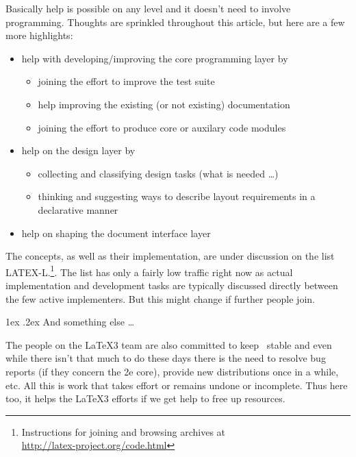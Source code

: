 \documentclass{ltnews}
\makeatletter
\newcommand{\@subheadingfont}{%
   \sffamily\slshape
   \let\LaTeX\cmssLaTeX\let\TeX\cmssTeX
}
\renewcommand{\subsection}{%
   \@startsection
      {subsection}{2}{\z@}{-1.5ex \@plus -1ex \@minus -.2ex}%
      {1ex \@plus.2ex}{\@subheadingfont}%
}
\makeatother
\begin{document}
Basically help is possible on any level and it doesn't need to involve programming. Thoughts are sprinkled throughout this article, but here are a few more highlights:
\begin{itemize}
\item help with developing/improving the core programming layer by
\begin{itemize}[nosep]
\item joining the effort to improve the test suite
\item help improving the existing (or not existing) documentation
\item joining the effort to produce core or auxilary code modules
\end{itemize}
\item help on the design layer by
\begin{itemize}[nosep]
\item collecting and classifying design tasks (what is needed \dots)
\item thinking and suggesting ways to describe layout requirements in a declarative manner
\end{itemize}
\item help on shaping the document interface layer
\end{itemize}
The concepts, as well as their implementation, are under discussion on the list LATEX-L.\footnote{Instructions for joining and browsing archives at\\ \url{http://latex-project.org/code.html}}.
The list has only a fairly low traffic right now as actual implementation and development tasks are typically discussed directly between the few active implementers. But this might change if further people join.

\subsection{And something else \dots}

The people on the \LaTeX3 team are also committed to keep \LaTeXe\ stable and even while there isn't that much to do these days there is the need to resolve bug reports (if they concern the 2e core), provide new distributions once in a while, etc. All this is work that takes effort or remains undone or incomplete. Thus here too, it helps the \LaTeX3 efforts if we get help to free up resources.
\end{document}
